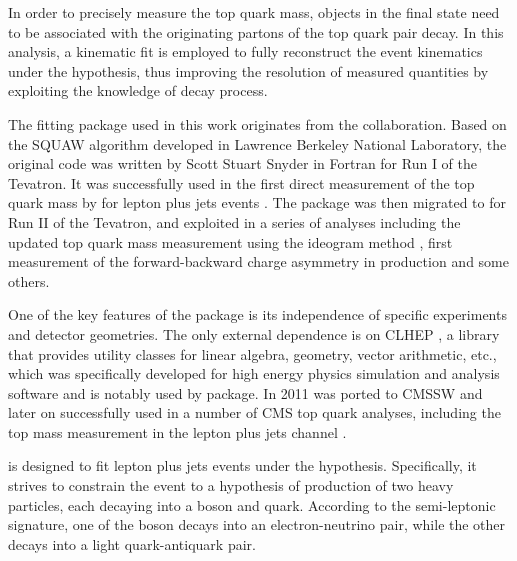 In order to precisely measure the top quark mass, objects in the final state need to be associated with the originating
partons of the top quark pair decay. In this analysis, a kinematic fit is employed to fully reconstruct the event
kinematics under the \ttbar hypothesis, thus improving the resolution of measured quantities by exploiting the knowledge
of decay process.

The \HitFit fitting package \autocite{HitFit} used in this work originates from the \Dzero collaboration. Based on the
SQUAW algorithm \autocite{SQUAW} developed in Lawrence Berkeley National Laboratory, the original \HitFit code was
written by Scott Stuart Snyder in Fortran for Run I of the Tevatron. It was successfully used in the first direct
measurement of the top quark mass by \Dzero for lepton plus jets \ttbar events \autocite{D0_top_mass_1998}. The package
was then migrated to \Cplusplus for Run II of the Tevatron, and exploited in a series of \ttbar analyses including the
updated top quark mass measurement using the ideogram method \autocite{D0_top_mass_ljets_ideogram}, first measurement of
the forward-backward charge asymmetry in \ttbar production \autocite{D0_charge_assymetry} and some others.

One of the key features of the \HitFit package is its independence of specific experiments and detector geometries. The
only external dependence is on \textsc{CLHEP} \autocite{CLHEP}, a \Cplusplus library that provides utility classes for
linear algebra, geometry, vector arithmetic, etc., which was specifically developed for high energy physics simulation
and analysis software and is notably used by \GEANTfour package. In 2011 \HitFit was ported to CMSSW and later on
successfully used in a number of CMS top quark analyses, including the top mass measurement in the lepton plus jets
channel \autocite{top_mass_ljets_CMS}.

\HitFit is designed to fit lepton plus jets events under the \ttbar hypothesis. Specifically, it strives to constrain
the event to a hypothesis of production of two heavy particles, each decaying into a \W boson and \cPqb quark. According
to the semi-leptonic signature, one of the \W boson decays into an electron-neutrino pair, while the other decays into a
light quark-antiquark pair.

